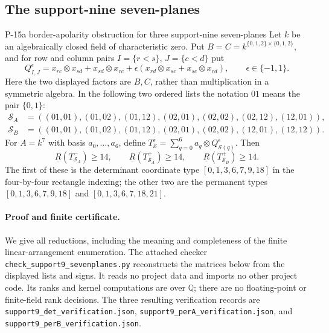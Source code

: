 \subsection{The support-nine seven-planes}
\begin{finding}{P-15}{a border-apolarity obstruction for three support-nine seven-planes}
Let $k$ be an algebraically closed field of characteristic zero.  Put
$B=C=k^{\{0,1,2\}\times\{0,1,2\}}$, and for row and column pairs
$I=\{r<s\}$, $J=\{c<d\}$ put
\[
 Q^{\epsilon}_{I,J}=
 x_{rc}\otimes x_{sd}+x_{sd}\otimes x_{rc}
 +\epsilon(x_{rd}\otimes x_{sc}+x_{sc}\otimes x_{rd}),
 \qquad \epsilon\in\{-1,1\}.
\]
Here the two displayed factors are $B,C$, rather than multiplication in a
symmetric algebra.  In the following two ordered lists the notation $01$
means the pair $\{0,1\}$:
\begin{align*}
 \mathcal S_A&=((01,01),(01,02),(01,12),(02,01),(02,02),(02,12),(12,01)),\\
 \mathcal S_B&=((01,01),(01,02),(01,12),(02,01),(02,02),(12,01),(12,12)).
\end{align*}
For $A=k^7$ with basis $a_0,\ldots,a_6$, define
$T^{\epsilon}_{\mathcal S}=\sum_{q=0}^6a_q\otimes Q^{\epsilon}_{\mathcal S(q)}$.
Then
\[
 \underline R(T^{-}_{\mathcal S_A})\ge14,\qquad
 \underline R(T^{+}_{\mathcal S_A})\ge14,\qquad
 \underline R(T^{+}_{\mathcal S_B})\ge14.
\]
The first of these is the determinant coordinate type
$[0,1,3,6,7,9,18]$ in the four-by-four rectangle indexing; the other two
are the permanent types $[0,1,3,6,7,9,18]$ and $[0,1,3,6,7,18,21]$.
\end{finding}

\paragraph{Proof and finite certificate.}
We give all reductions, including the meaning and completeness of the
finite linear-arrangement enumeration.  The attached checker
\texttt{check\_support9\_sevenplanes.py} reconstructs the matrices below
from the displayed lists and signs.  It reads no project data and imports
no other project code.  Its ranks and kernel computations are over
$\mathbb Q$; there are no floating-point or finite-field rank decisions.
The three resulting verification records are
\texttt{support9\_det\_verification.json},
\texttt{support9\_perA\_verification.json}, and
\texttt{support9\_perB\_verification.json}.

